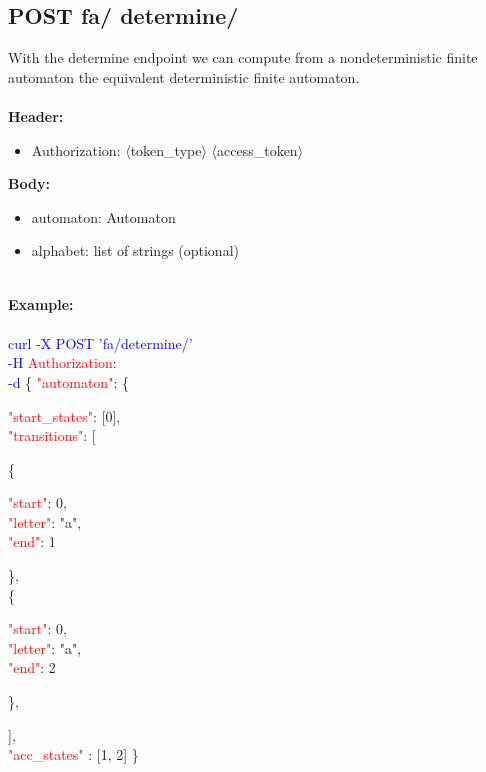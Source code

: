 \subsection{POST fa/ determine/}
With the determine endpoint we can compute from a nondeterministic finite automaton the equivalent deterministic finite automaton.\\
\ \\
\textbf{Header:}
\begin{itemize}
    \item Authorization: $\langle$token\_type$\rangle$ $\langle$access\_token$\rangle$
\end{itemize}
\textbf{Body:}
\ \\
\begin{itemize}
    \item automaton: Automaton
    \item alphabet: list of strings (optional)
\end{itemize}
\ \\
\textbf{Example:} \\
\ \\
\textcolor{blue}{curl -X POST '\BaseURL fa/determine/'\\
-H} \textcolor{red}{Authorization}: \Auth \\
\textcolor{blue}{-d} \{ 
     \textcolor{red}{"automaton"}: \{
     \begin{adjustwidth}{7.5 mm}{0 cm}
     \begin{adjustwidth}{7.5 mm}{0 cm}
            \textcolor{red}{"start\_states"}: [0],\\
            \textcolor{red}{"transitions"}: [
            \begin{adjustwidth}{7.5 mm}{0 cm}
            \{
               \begin{adjustwidth}{7.5 mm}{0 cm}
                    \textcolor{red}{"start"}: 0,\\
                    \textcolor{red}{"letter"}: "a",\\
                    \textcolor{red}{"end"}: 1
               \end{adjustwidth}
            \}, \\
            \{
               \begin{adjustwidth}{7.5 mm}{0 cm}
                    \textcolor{red}{"start"}: 0,\\
                    \textcolor{red}{"letter"}: "a",\\
                    \textcolor{red}{"end"}: 2
               \end{adjustwidth}
            \},
            \end{adjustwidth}
            ],\\
        \textcolor{red}{"acc\_states" }: [1, 2]  \}
    \end{adjustwidth}
    \end{adjustwidth}
